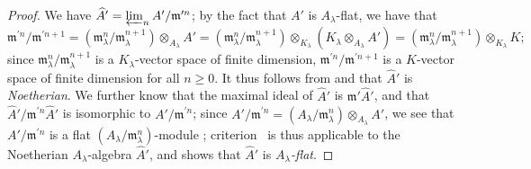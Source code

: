 \documentclass[oneside]{amsart}
\theoremstyle{ega-env-style}
\theoremstyle{ega-thm-env-style}
\theoremstyle{ega-defn-env-style}
\def\geq{\geqslant}                 %
\begin{document}
\begin{proof}
We have $\widehat{A}'=\varprojlim_n A'/\mathfrak{m}^{\prime n}$;
by the fact that $A'$ is $A_\lambda$-flat, we have that
\[
  \mathfrak{m}^{\prime n}/\mathfrak{m}^{\prime n+1}=(\mathfrak{m}_\lambda^{n}/\mathfrak{m}_\lambda^{n+1})\otimes_{A_\lambda}A'=(\mathfrak{m}_\lambda^{n}/\mathfrak{m}_\lambda^{n+1})\otimes_{K_\lambda}(K_\lambda\otimes_{A_\lambda}A')=(\mathfrak{m}_\lambda^{n}/\mathfrak{m}_\lambda^{n+1})\otimes_{K_\lambda}K;
\]
since $\mathfrak{m}_\lambda^{n}/\mathfrak{m}_\lambda^{n+1}$ is a $K_\lambda$-vector space of finite dimension, $\mathfrak{m}^{\prime n}/\mathfrak{m}^{\prime n+1}$ is a $K$-vector space of finite dimension for all $n\geq 0$.
It thus follows from  and  that $\widehat{A}'$ is \emph{Noetherian}.
We further know that the maximal ideal of $\widehat{A}'$ is $\mathfrak{m}'\widehat{A}'$, and that $\widehat{A}'/\mathfrak{m}^{\prime n}\widehat{A}'$ is isomorphic to $A'/\mathfrak{m}^{\prime n}$;
since $A'/\mathfrak{m}^{\prime n}=(A_\lambda/\mathfrak{m}_\lambda^n)\otimes_{A_\lambda}A'$, we see that $A'/\mathfrak{m}^{\prime n}$ is a flat $(A_\lambda/\mathfrak{m}_\lambda^n)$-module ;
criterion~ is thus applicable to the Noetherian $A_\lambda$-algebra $\widehat{A}'$, and shows that $\widehat{A}'$ is \emph{$A_\lambda$-flat}.
\end{proof}
\end{document}

